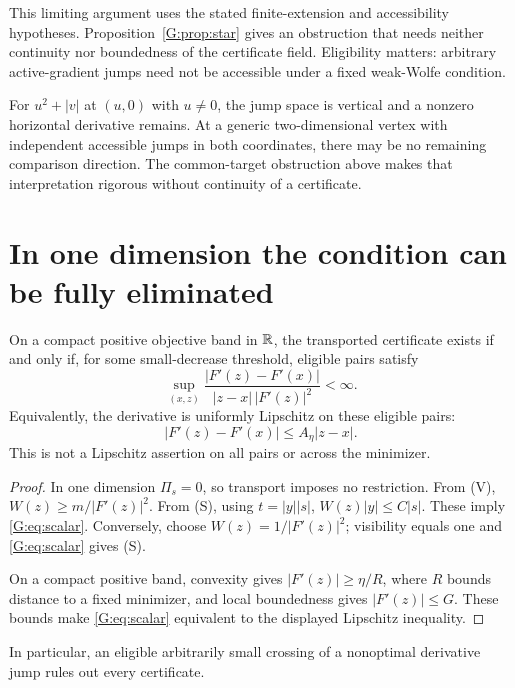 This limiting argument uses the stated finite-extension and accessibility hypotheses. Proposition~\ref{G:prop:star} gives an obstruction that needs neither continuity nor boundedness of the certificate field. Eligibility matters: arbitrary active-gradient jumps need not be accessible under a fixed weak-Wolfe condition.

For $u^2+|v|$ at $(u,0)$ with $u\ne0$, the jump space is vertical and a nonzero horizontal derivative remains. At a generic two-dimensional vertex with independent accessible jumps in both coordinates, there may be no remaining comparison direction. The common-target obstruction above makes that interpretation rigorous without continuity of a certificate.


\setcounter{section}{5}
\setcounter{theorem}{0}
\setcounter{equation}{5}


\section{In one dimension the condition can be fully eliminated}
\begin{proposition}
On a compact positive objective band in $\mathbb R$, the transported certificate exists if and only if, for some small-decrease threshold, eligible pairs satisfy
\begin{equation}
 \sup_{(x,z)}\frac{|F'(z)-F'(x)|}{|z-x|\,|F'(z)|^2}<\infty. \label{G:eq:scalar}
\end{equation}
Equivalently, the derivative is uniformly Lipschitz on these eligible pairs:
\[
 |F'(z)-F'(x)|\le A_\eta|z-x|.
\]
This is not a Lipschitz assertion on all pairs or across the minimizer.
\end{proposition}
\begin{proof}
In one dimension $\Pi_s=0$, so transport imposes no restriction. From (V),
$W(z)\ge m/|F'(z)|^2$. From (S), using $t=|y||s|$,
$W(z)|y|\le C|s|$. These imply \eqref{G:eq:scalar}. Conversely, choose
$W(z)=1/|F'(z)|^2$; visibility equals one and \eqref{G:eq:scalar} gives (S).

On a compact positive band, convexity gives $|F'(z)|\ge\eta/R$, where $R$ bounds distance to a fixed minimizer, and local boundedness gives $|F'(z)|\le G$. These bounds make \eqref{G:eq:scalar} equivalent to the displayed Lipschitz inequality.
\end{proof}
In particular, an eligible arbitrarily small crossing of a nonoptimal derivative jump rules out every certificate.

